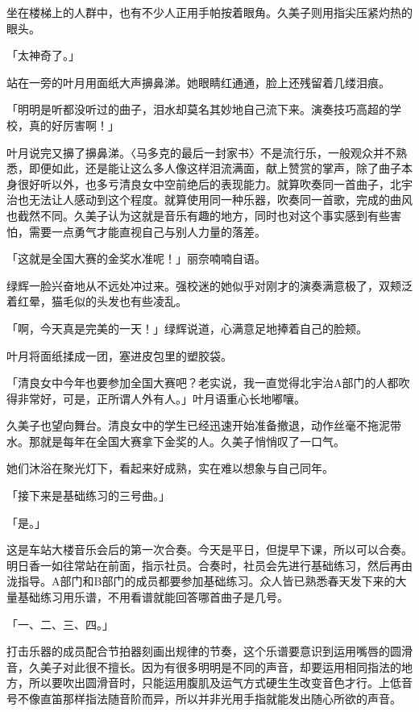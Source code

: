 \documentclass[UTF8]{ctexart}
\begin{document}
    坐在楼梯上的人群中，也有不少人正用手帕按着眼角。久美子则用指尖压紧灼热的眼头。 

    「太神奇了。」 

    站在一旁的叶月用面纸大声擤鼻涕。她眼睛红通通，脸上还残留着几缕泪痕。 

    「明明是听都没听过的曲子，泪水却莫名其妙地自己流下来。演奏技巧高超的学校，真的好厉害啊！」 

    叶月说完又擤了擤鼻涕。〈马多克的最后一封家书〉不是流行乐，一般观众并不熟悉，即便如此，还是能让这么多人像这样泪流满面，献上赞赏的掌声，除了曲子本身很好听以外，也多亏清良女中空前绝后的表现能力。就算吹奏同一首曲子，北宇治也无法让人感动到这个程度。就算使用同一种乐器，吹奏同一首歌，完成的曲风也截然不同。久美子认为这就是音乐有趣的地方，同时也对这个事实感到有些害怕，需要一点勇气才能直视自己与别人力量的落差。 

    「这就是全国大赛的金奖水准呢！」丽奈喃喃自语。 

    绿辉一脸兴奋地从不远处冲过来。强校迷的她似乎对刚才的演奏满意极了，双颊泛着红晕，猫毛似的头发也有些凌乱。 

    「啊，今天真是完美的一天！」绿辉说道，心满意足地捧着自己的脸颊。 

    叶月将面纸揉成一团，塞进皮包里的塑胶袋。 

    「清良女中今年也要参加全国大赛吧？老实说，我一直觉得北宇治A部门的人都吹得非常好，可是，正所谓人外有人。」叶月语重心长地嘟嚷。 

    久美子也望向舞台。清良女中的学生已经迅速开始准备撤退，动作丝毫不拖泥带水。那就是每年在全国大赛拿下金奖的人。久美子悄悄叹了一口气。 

    她们沐浴在聚光灯下，看起来好成熟，实在难以想象与自己同年。 

    「接下来是基础练习的三号曲。」 

    「是。」 

    这是车站大楼音乐会后的第一次合奏。今天是平日，但提早下课，所以可以合奏。明日香一如往常站在前面，指示社员。合奏时，社员会先进行基础练习，然后再由泷指导。A部门和B部门的成员都要参加基础练习。众人皆已熟悉春天发下来的大量基础练习用乐谱，不用看谱就能回答哪首曲子是几号。 

    「一、二、三、四。」 

    打击乐器的成员配合节拍器刻画出规律的节奏，这个乐谱要意识到运用嘴唇的圆滑音，久美子对此很不擅长。因为有很多明明是不同的声音，却要运用相同指法的地方，所以要吹出圆滑音时，只能运用腹肌及运气方式硬生生改变音色才行。上低音号不像直笛那样指法随音阶而异，所以并非光用手指就能发出随心所欲的声音。 
\end{document}
